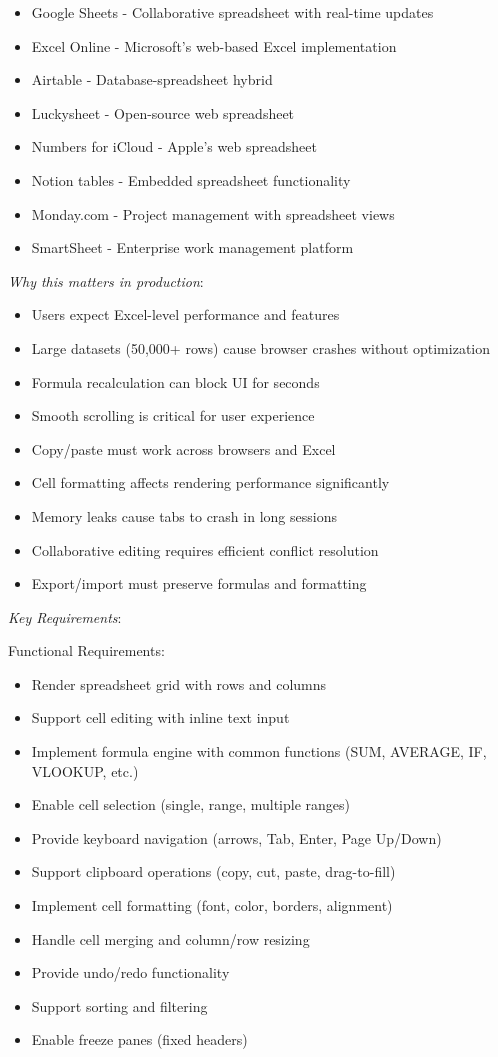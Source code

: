 \documentclass[11pt]{article}
\begin{document}
\begin{itemize}
\item Google Sheets - Collaborative spreadsheet with real-time updates
\item Excel Online - Microsoft's web-based Excel implementation
\item Airtable - Database-spreadsheet hybrid
\item Luckysheet - Open-source web spreadsheet
\item Numbers for iCloud - Apple's web spreadsheet
\item Notion tables - Embedded spreadsheet functionality
\item Monday.com - Project management with spreadsheet views
\item SmartSheet - Enterprise work management platform
\end{itemize}

\emph{Why this matters in production}:

\begin{itemize}
\item Users expect Excel-level performance and features
\item Large datasets (50,000+ rows) cause browser crashes without optimization
\item Formula recalculation can block UI for seconds
\item Smooth scrolling is critical for user experience
\item Copy/paste must work across browsers and Excel
\item Cell formatting affects rendering performance significantly
\item Memory leaks cause tabs to crash in long sessions
\item Collaborative editing requires efficient conflict resolution
\item Export/import must preserve formulas and formatting
\end{itemize}

\emph{Key Requirements}:

Functional Requirements:

\begin{itemize}
\item Render spreadsheet grid with rows and columns
\item Support cell editing with inline text input
\item Implement formula engine with common functions (SUM, AVERAGE, IF, VLOOKUP, etc.)
\item Enable cell selection (single, range, multiple ranges)
\item Provide keyboard navigation (arrows, Tab, Enter, Page Up/Down)
\item Support clipboard operations (copy, cut, paste, drag-to-fill)
\item Implement cell formatting (font, color, borders, alignment)
\item Handle cell merging and column/row resizing
\item Provide undo/redo functionality
\item Support sorting and filtering
\item Enable freeze panes (fixed headers)
\end{itemize}
\end{document}
